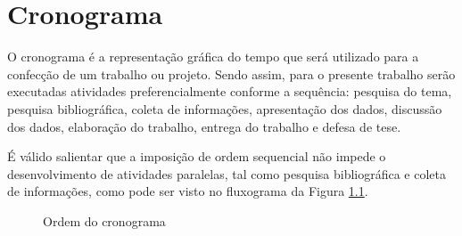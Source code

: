 \chapter{Cronograma}

O cronograma é a representação gráfica do tempo que será utilizado para a confecção de um trabalho ou projeto. Sendo assim, para o presente trabalho serão executadas atividades preferencialmente conforme a sequência: pesquisa do tema, pesquisa bibliográfica, coleta de informações, apresentação dos dados, discussão dos dados, elaboração do trabalho, entrega do trabalho e defesa de tese.

\begin{table}[H]
\centering
\caption{Detalhamento do Cronograma}
\label{my-label}
\end{table}

É válido salientar que a imposição de ordem sequencial não impede o desenvolvimento de atividades paralelas, tal como pesquisa bibliográfica e coleta de informações, como pode ser visto no fluxograma da Figura \ref{fluxograma}.

\begin{figure}[H]
    \centering
    \caption{Ordem do cronograma}
    \label{fluxograma}
\end{figure}